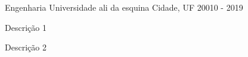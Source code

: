 

\begin{cventries}

  \cventry
    {Engenharia} %
    {Universidade ali da esquina} %
    {Cidade, UF} %
    {20010 - 2019} %
    {
      \begin{cvitems} %
        \item {Descrição 1}
        \item {Descrição 2}
      \end{cvitems}
    }




\end{cventries}
